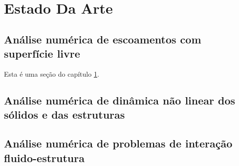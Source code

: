 \documentclass[_ArquivoPrincipal.tex]{subfiles}
\begin{document}
\chapter{Estado Da Arte}\label{cap:EstadoArte}

\section{Análise numérica de escoamentos com superfície livre} \label{sec:CFDMovel}

Esta é uma seção do capítulo \ref{cap:EstadoArte}.

\section{Análise numérica de dinâmica não linear dos sólidos e das estruturas} 

\section{Análise numérica de problemas de interação fluido-estrutura} 
\end{document}
